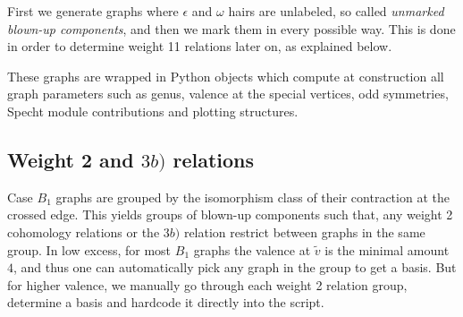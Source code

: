 First we generate graphs where $\epsilon$ and $\omega$ hairs are unlabeled, so called \textit{unmarked blown-up components}, and then we mark them in every possible way. This is done in order to determine weight 11 relations later on, as explained below.

These graphs are wrapped in Python objects which compute at construction all graph parameters such as genus, valence at the special vertices, odd symmetries, Specht module contributions and plotting structures.

\subsection{Weight 2 and $3b)$ relations} Case $B_1$ graphs are grouped by the isomorphism class of their contraction at the crossed edge.
This yields groups of blown-up components such that, any weight 2 cohomology relations or the $3b)$ relation restrict between graphs in the same group. In low excess, for most $B_1$ graphs the valence at $\tilde{v}$ is the minimal amount $4$, and thus one can automatically pick any graph in the group to get a basis. But for higher valence, we manually go through each weight 2 relation group, determine a basis and hardcode it directly into the script.

